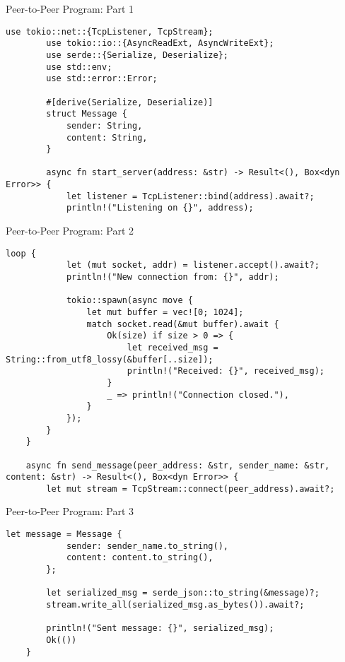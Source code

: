 \documentclass[aspectratio=169, table]{beamer}
\begin{document}
\begin{frame}[fragile]{Peer-to-Peer Program: Part 1}
	\begin{lstlisting}[style=RustStyle]
		use tokio::net::{TcpListener, TcpStream};
		use tokio::io::{AsyncReadExt, AsyncWriteExt};
		use serde::{Serialize, Deserialize};
		use std::env;
		use std::error::Error;
		
		#[derive(Serialize, Deserialize)]
		struct Message {
			sender: String,
			content: String,
		}
		
		async fn start_server(address: &str) -> Result<(), Box<dyn Error>> {
			let listener = TcpListener::bind(address).await?;
			println!("Listening on {}", address);
		\end{lstlisting}
	\end{frame}
\begin{frame}[fragile]{Peer-to-Peer Program: Part 2}
	\vspace{20pt}
	\begin{lstlisting}[style=RustStyle]
		loop {
			let (mut socket, addr) = listener.accept().await?;
			println!("New connection from: {}", addr);
			
			tokio::spawn(async move {
				let mut buffer = vec![0; 1024];
				match socket.read(&mut buffer).await {
					Ok(size) if size > 0 => {
						let received_msg = String::from_utf8_lossy(&buffer[..size]);
						println!("Received: {}", received_msg);
					}
					_ => println!("Connection closed."),
				}
			});
		}
	}
	
	async fn send_message(peer_address: &str, sender_name: &str, content: &str) -> Result<(), Box<dyn Error>> {
		let mut stream = TcpStream::connect(peer_address).await?;
	\end{lstlisting}
\end{frame}
\begin{frame}[fragile]{Peer-to-Peer Program: Part 3}
	\begin{lstlisting}[style=RustStyle]
		let message = Message {
			sender: sender_name.to_string(),
			content: content.to_string(),
		};
		
		let serialized_msg = serde_json::to_string(&message)?;
		stream.write_all(serialized_msg.as_bytes()).await?;
		
		println!("Sent message: {}", serialized_msg);
		Ok(())
	}
\end{lstlisting}
\end{frame}
\end{document}
